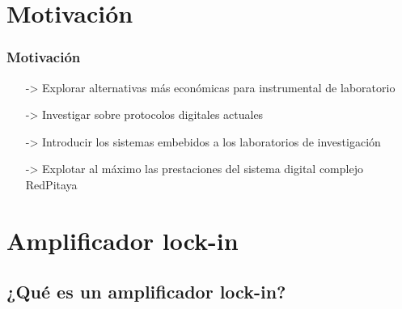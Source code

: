 \documentclass{beamer}
\begin{document}
\section{Motivación}

\begin{frame}
\frametitle{Motivación}
\begin{alertblock}{}
\begin{itemize}
\pause
\item[->] Explorar \alert{alternativas más económicas} para instrumental de laboratorio 
\item[->] Investigar sobre \alert{protocolos digitales actuales}
\item[->] Introducir los sistemas embebidos a los laboratorios de investigación
\item[->] \alert{Explotar al máximo las prestaciones} del sistema digital complejo
{\color[rgb]{0.00,0.21,0.47}RedPitaya}
\end{itemize}
\end{alertblock}
\end{frame}

\section{Amplificador lock-in}

\subsection{¿Qué es un amplificador lock-in?}
\end{document}
